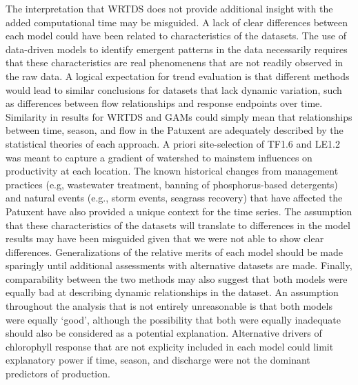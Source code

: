 \documentclass[letterpaper,12pt,oneside]{article}\usepackage[]{graphicx}\usepackage[]{color}
\begin{document}
The interpretation that \ac{WRTDS} does not provide additional insight with the added computational time may be misguided.  A lack of clear differences between each model could have been related to characteristics of the datasets.  The use of data-driven models to identify emergent patterns in the data necessarily requires that these characteristics are real phenomenens that are not readily observed in the raw data.  A logical expectation for trend evaluation is that different methods would lead to similar conclusions for datasets that lack dynamic variation, such as differences between flow relationships and response endpoints over time.  Similarity in results for \ac{WRTDS} and \acp{GAM} could simply mean that relationships between time, season, and flow in the Patuxent are adequately described by the statistical theories of each approach.  A priori site-selection of TF1.6 and LE1.2 was meant to capture a gradient of watershed to mainstem influences on productivity at each location.  The known historical changes from management practices (e.g, wastewater treatment, banning of phosphorus-based detergents) and natural events (e.g., storm events, seagrass recovery) that have affected the Patuxent have also provided a unique context for the time series.  The assumption that these characteristics of the datasets will translate to differences in the model results may have been misguided given that we were not able to show clear differences.  Generalizations of the relative merits of each model should be made sparingly until additional assessments with alternative datasets are made.  Finally, comparability between the two methods may also suggest that both models were equally bad at describing dynamic relationships in the dataset.  An assumption throughout the analysis that is not entirely unreasonable is that both models were equally `good', although the possibility that both were equally inadequate should also be considered as a potential explanation.  Alternative drivers of chlorophyll response that are not explicity included in each model could limit explanatory power if time, season, and discharge were not the dominant predictors of production.  
\end{document}
